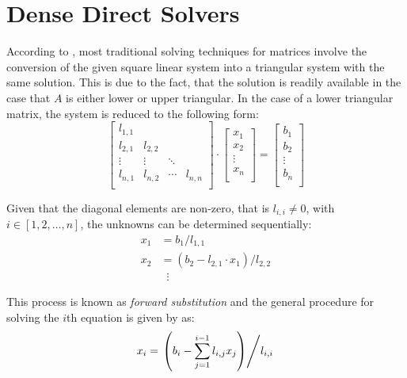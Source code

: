 \section{Dense Direct Solvers}
\label{sec:direct_solvers}

According to \cite{golub_matrix_2013}, most traditional solving techniques for matrices involve the conversion of the given square linear system into a triangular system with the same solution. This is due to the fact, that the solution is readily available in the case that $A$ is either lower or upper triangular. In the case of a lower triangular matrix, the system is reduced to the following form:
\begin{equation}
  \left[
    \begin{array}{cccc}
      l_{1,1} &  &  & \\
      l_{2,1} & l_{2,2} &  &  \\
      \vdots& \vdots & \ddots &  \\
      l_{n,1} & l_{n,2} & \cdots & l_{n,n}\\
    \end{array}
  \right] \cdot
  \left[
    \begin{array}{c}
      x_{1} \\
      x_{2} \\
      \vdots \\
      x_{n}  \\
    \end{array}
  \right] = 
  \left[
    \begin{array}{c}
      b_{1} \\
      b_{2} \\
      \vdots \\
      b_{n}  \\
    \end{array}
  \right] 
\end{equation}

\noindent Given that the diagonal elements are non-zero, that is $l_{i,i} \neq 0$, with $i \in [1,2, \dots, n]$, the unknowns can be determined sequentially:
\begin{equation}
\begin{aligned}
    x_1 & =  b_1/l_{1,1} \\
    x_2 & =  (b_2-l_{2,1}\cdot x_1)/l_{2,2} \\
    & \;\;\vdots 
\end{aligned}
\end{equation}

\noindent This process is known as \textit{forward substitution} and the general procedure for solving the $i$th equation is given by \cite{golub_matrix_2013} as:
\begin{equation}
    x_i=\left. \left( b_i-\sum_{j=1}^{i-1}l_{i,j}x_j\right) \middle/ l_{i,i} \right.
\end{equation}

